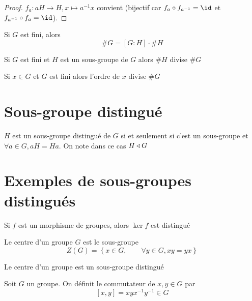 \begin{proof}
    $f_a:aH\longrightarrow H, x\longmapsto a^{-1}x$ convient (bijectif car $f_a\circ f_{a ^{-1}}=\id$ et $f_{a^{-1}}\circ f_a=\id$).
\end{proof}

\begin{cor}
    Si $G$ est fini, alors  \[\#G=[G:H]\cdot \#H\]
\end{cor}

\begin{thm}[Lagrange]
Si $G$ est fini et  $H$ est un sous-groupe de  $G$ alors  $\#H$ divise $\#G$
\end{thm}

\begin{cor}
Si $x \in  G$ et $G$ est fini alors l'ordre de  $x$ divise $\#G$
\end{cor}

\section{Sous-groupe distingué}

\begin{dfn}
    $H$ est un sous-groupe distingué de  $G$  si et seulement si c'est un sous-groupe et $\forall  a \in G, aH=Ha$. On note dans ce cas $H\triangleleft G$
\end{dfn}

\section{Exemples de sous-groupes distingués}

\begin{prop}
Si $f$ est un morphisme de groupes, alors  $\ker f$ est distingué
\end{prop}

\begin{dfn}[Centre]
    Le centre d'un groupe $G$ est le sous-groupe  \[
            Z(G)= \left\{ x \in  G, \qquad  \forall  y \in  G, xy=yx \right\} 
    \]
\end{dfn}
\begin{prop}
    Le centre d'un groupe est un sous-groupe distingué
\end{prop}

\begin{dfn}[Commutateur]
    Soit $G$ un groupe. On définit le commutateur de  $x, y \in  G$ par \[
        [x, y]=xyx^{-1}y^{-1} \in  G
    \] 
\end{dfn}

